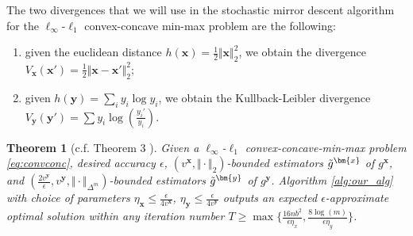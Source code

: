 \documentclass[10pt]{article} %
\newtheorem{theorem}{Theorem}
\def\vx{{\bm{x}}}
\def\vy{{\bm{y}}}
\def\evy{{y}}
\begin{document}
The two divergences that we will use in the stochastic mirror descent algorithm for the $\ell_\infty$-$\ell_1$ convex-concave min-max problem are the following:
\begin{enumerate}
    \item given the euclidean distance $h(\vx) = \frac{1}{2}\Vert \vx \Vert_2^2$, we obtain the divergence $V_\vx(\vx') = \frac{1}{2}\Vert\vx -\vx'\Vert^2_2$;
    \item given $h(\vy) = \sum_{i}\evy_i\log \evy_i$, we obtain the Kullback-Leibler divergence $V_\vy(\vy') = \sum \evy_i \log\left(\frac{\evy_i'}{\evy_i}\right)$.
\end{enumerate}
\begin{theorem}[c.f. Theorem 3 \citep{Jin2020}]\label{theorem:SMDconvergence}
    Given a $\ell_\infty$-$\ell_1$ convex-concave-min-max problem \eqref{eq:convconc},  desired accuracy $\epsilon$, $(v^\vx, \Vert \cdot \Vert_2)$-bounded estimators $\Tilde{g}^\vx$ of $g^\vx$, and $(\frac{2v^\vy}{\epsilon}, v^\vy, \Vert \cdot \Vert_{\Delta^m})$-bounded estimators $\Tilde{g}^\vy$ of $g^\vy$. Algorithm \ref{alg:our_alg} with choice of parameters $\eta_\vx \leq \frac{\epsilon}{4v^\vx}$, $\eta_\vy \leq \frac{\epsilon}{4v^\vy}$ outputs an expected $\epsilon$-approximate optimal solution within any iteration number $T\geq \max\{\frac{16nb^2}{\epsilon\eta_x}, \frac{8\log(m)}{\epsilon\eta_y}\}$.
\end{theorem}
\end{document}
